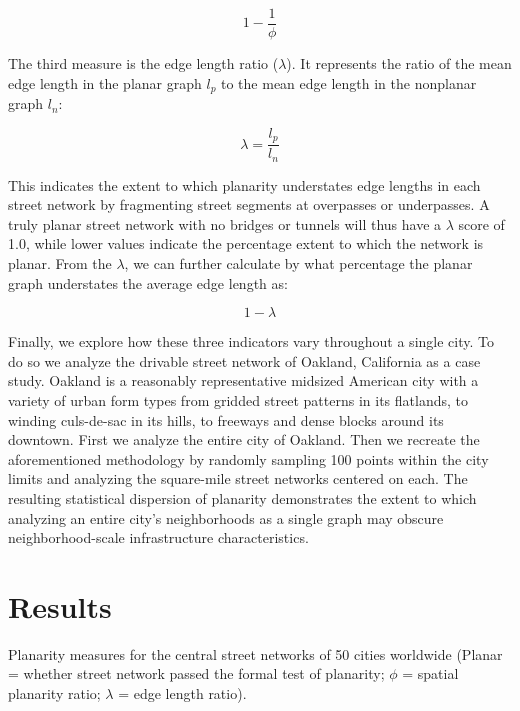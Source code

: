 \documentclass[Afour,sageh,times]{sagej}
\begin{document}
\begin{equation}
	\label{eq:spr_overstates}
	1 - \frac{1}{\phi}
\end{equation}

The third measure is the edge length ratio ($\lambda$). It represents the ratio of the mean edge length in the planar graph $l_p$ to the mean edge length in the nonplanar graph $l_n$:

\begin{equation}
	\label{eq:elr}
	\lambda = \frac{l_p}{l_n}
\end{equation}

This indicates the extent to which planarity understates edge lengths in each street network by fragmenting street segments at overpasses or underpasses. A truly planar street network with no bridges or tunnels will thus have a $\lambda$ score of 1.0, while lower values indicate the percentage extent to which the network is planar. From the $\lambda$, we can further calculate by what percentage the planar graph understates the average edge length as:

\begin{equation}
	\label{eq:elr_understates}
	1 - \lambda
\end{equation}

Finally, we explore how these three indicators vary throughout a single city. To do so we analyze the drivable street network of Oakland, California as a case study. Oakland is a reasonably representative midsized American city with a variety of urban form types from gridded street patterns in its flatlands, to winding culs-de-sac in its hills, to freeways and dense blocks around its downtown. First we analyze the entire city of Oakland. Then we recreate the aforementioned methodology by randomly sampling 100 points within the city limits and analyzing the square-mile street networks centered on each. The resulting statistical dispersion of planarity demonstrates the extent to which analyzing an entire city's neighborhoods as a single graph may obscure neighborhood-scale infrastructure characteristics.



\section{Results}

\begin{table}[htbp]
	\centering
	\caption{Planarity measures for the central street networks of 50 cities worldwide (Planar = whether street network passed the formal test of planarity; $\phi$ = spatial planarity ratio; $\lambda$ = edge length ratio).}
	\label{tab:world_cities}
	
\end{table}
\end{document}
